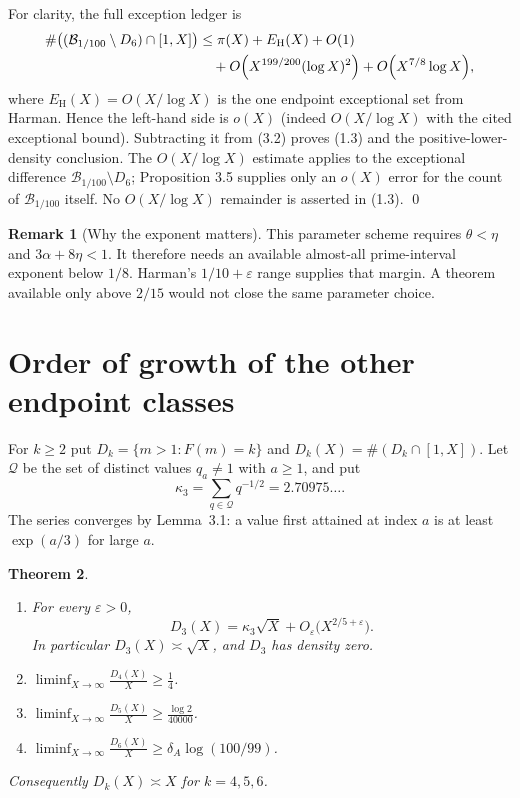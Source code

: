\documentclass[letterpaper]{article}
\newtheorem{theorem}{Theorem}[section]
\theoremstyle{definition}
\newtheorem{bremark}[theorem]{Remark}
\theoremstyle{remark}
\numberwithin{equation}{section}
\begin{document}
For clarity, the full exception ledger is
\begin{equation}
\begin{split}
  \#\bigl((\mathcal B_{1/100}\setminus D_6)\cap[1,X]\bigr)&\le\pi(X)+E_{\mathrm H}(X)+O(1)\\
  &\quad+O\Bigl(X^{199/200}(\log X)^2\Bigr)+O\Bigl(X^{7/8}\log X\Bigr),
\end{split}
\end{equation}
where $E_{\mathrm H}(X)=O(X/\log X)$ is the one endpoint exceptional set from Harman. Hence the
left-hand side is $o(X)$ (indeed $O(X/\log X)$ with the cited exceptional bound). Subtracting it
from (3.2) proves (1.3) and the positive-lower-density conclusion. The $O(X/\log X)$ estimate
applies to the exceptional difference $\mathcal B_{1/100}\setminus D_6$; Proposition 3.5 supplies only an $o(X)$ error for
the count of $\mathcal B_{1/100}$ itself. No $O(X/\log X)$ remainder is asserted in (1.3).
\qed

\begin{bremark}[Why the exponent matters]
This parameter scheme requires $\theta<\eta$ and
$3\alpha+8\eta<1$. It therefore needs an available almost-all prime-interval exponent below $1/8$. Harman's
$1/10+\varepsilon$ range supplies that margin. A theorem available only above $2/15$ would not close the same
parameter choice.
\end{bremark}

\section{Order of growth of the other endpoint classes}\label{sec:growth}

For $k\ge 2$ put $D_k=\{m>1:F(m)=k\}$ and $D_k(X)=\#(D_k\cap[1,X])$. Let $\mathcal Q$ be the set of
distinct values $q_a\ne 1$ with $a\ge 1$, and put
\[
  \kappa_3=\sum_{q\in\mathcal Q}q^{-1/2}=2.70975\ldots .
\]
The series converges by Lemma~3.1: a value first attained at index $a$ is at least $\exp(a/3)$ for
large $a$.

\begin{theorem}\label{thm:growth}
\begin{enumerate}
\item[(i)] For every $\varepsilon>0$,
  \[ D_3(X)=\kappa_3\sqrt X+O_\varepsilon\bigl(X^{2/5+\varepsilon}\bigr). \]
  In particular $D_3(X)\asymp\sqrt X$, and $D_3$ has density zero.
\item[(ii)] $\displaystyle\liminf_{X\to\infty}\frac{D_4(X)}{X}\ge\frac14$.
\item[(iii)] $\displaystyle\liminf_{X\to\infty}\frac{D_5(X)}{X}\ge\frac{\log 2}{40000}$.
\item[(iv)] $\displaystyle\liminf_{X\to\infty}\frac{D_6(X)}{X}\ge\delta_A\log(100/99)$.
\end{enumerate}
Consequently $D_k(X)\asymp X$ for $k=4,5,6$.
\end{theorem}
\end{document}

